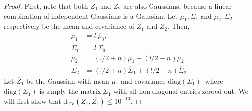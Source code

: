 \documentclass[10pt]{article} %
\theoremstyle{plain}
\newcommand{\dtv}{\mathrm{d_{TV}}}
\newcommand{\diag}{\mathrm{diag}}
\begin{document}
\begin{proof}
	First, note that both $Z_1$ and $Z_2$ are also Gaussians, because a linear combination of independent Gaussians is a Gaussian. Let $\mu_1, \Sigma_1$ and $\mu_2, \Sigma_2$ respectively be the mean and covariance of $Z_1$ and $Z_2$. Then, 
	\begin{align*}
		\mu_1 &= l \ \overline{\mu}_3,\\
		\Sigma_1 &= l \ \overline{\Sigma}_3\\
		\mu_2  &= (l/2 + n) \overline{\mu}_1 + (l/2 - n) \overline{\mu}_2\\
		\Sigma_2 &= (l/2 + n) \overline{\Sigma}_1 + (l/2 - n) \overline{\Sigma}_2
	\end{align*}
	Let $\overline{Z}_1$ be the Gaussian with mean $\mu_1$ and covariance $\diag(\Sigma_1)$, where $\diag(\Sigma_1)$ is simply the matrix $\Sigma_1$ with all non-diagonal entries zeroed out. We will first show that $\dtv(Z_1, \overline{Z_1}) \le 10^{-13}$.
	

\end{proof}
\end{document}
